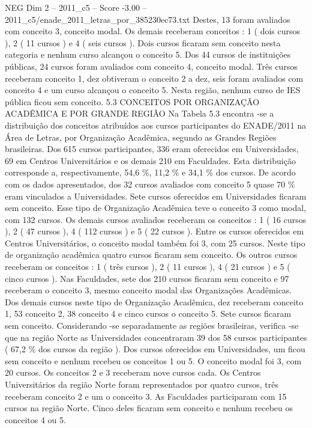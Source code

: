 \begin{textsample}{NEG Dim 2 – 2011\_c5 – Score -3.00 – 2011\_c5/enade\_2011\_letras\_por\_385230ec73.txt}
Destes, 13 foram avaliados com conceito 3, conceito modal.
Os demais receberam conceitos : 1 ( dois cursos ), 2 ( 11 cursos ) e 4 ( seis cursos ).
Dois cursos ficaram sem conceito nesta categoria e nenhum curso alcançou o conceito 5.
Dos 44 cursos de instituições públicas, 24 cursos foram avaliados com conceito 4, conceito modal.
Três cursos receberam conceito 1, dez obtiveram o conceito 2 a dez, seis foram avaliados com conceito 4 e um curso alcançou o conceito 5.
Nesta região, nenhum curso de IES pública ficou sem conceito. 5.3 CONCEITOS POR ORGANIZAÇÃO ACADÊMICA E POR GRANDE REGIÃO Na Tabela 5.3 encontra -se a distribuição dos conceitos atribuídos aos cursos participantes do ENADE/2011 na Área de Letras, por Organização Acadêmica, segundo as Grandes Regiões brasileiras.
Dos 615 cursos participantes, 336 eram oferecidos em Universidades, 69 em Centros Universitários e os demais 210 em Faculdades.
Esta distribuição corresponde a, respectivamente, 54,6 \%, 11,2 \% e 34,1 \% dos cursos.
De acordo com os dados apresentados, dos 32 cursos avaliados com conceito 5 quase 70 \% eram vinculados a Universidades.
Sete cursos oferecidos em Universidades ficaram sem conceito.
Esse tipo de Organização Acadêmica teve o conceito 3 como modal, com 132 cursos.
Os demais cursos avaliados receberam os conceitos : 1 ( 16 cursos ), 2 ( 47 cursos ), 4 ( 112 cursos ) e 5 ( 22 cursos ).
Entre os cursos oferecidos em Centros Universitários, o conceito modal também foi 3, com 25 cursos.
Neste tipo de organização acadêmica quatro cursos ficaram sem conceito.
Os outros cursos receberam os conceitos : 1 ( três cursos ), 2 ( 11 cursos ), 4 ( 21 cursos ) e 5 ( cinco cursos ).
Nas Faculdades, sete dos 210 cursos ficaram sem conceito e 97 receberam o conceito 3, mesmo conceito modal das Organizações Acadêmicas.
Dos demais cursos neste tipo de Organização Acadêmica, dez receberam conceito 1, 53 conceito 2, 38 conceito 4 e cinco cursos o conceito 5.
Sete cursos ficaram sem conceito.
Considerando -se separadamente as regiões brasileiras, verifica -se que na região Norte as Universidades concentraram 39 dos 58 cursos participantes ( 67,2 \% dos cursos da região ).
Dos cursos oferecidos em Universidades, um ficou sem conceito e nenhum recebeu os conceitos 1 ou 5.
O conceito modal foi 3, com 20 cursos.
Os conceitos 2 e 3 receberam nove cursos cada.
Os Centros Universitários da região Norte foram representados por quatro cursos, três receberam conceito 2 e um o conceito 3.
As Faculdades participaram com 15 cursos na região Norte.
Cinco deles ficaram sem conceito e nenhum recebeu os conceitos 4 ou 5.

\end{textsample}
